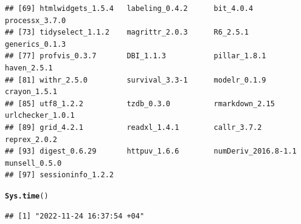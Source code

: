\documentclass{article}\usepackage[]{graphicx}\usepackage[]{xcolor}
\makeatletter
\newcommand{\hlstd}[1]{\textcolor[rgb]{0.345,0.345,0.345}{#1}}%
\newcommand{\hlkwd}[1]{\textcolor[rgb]{0.737,0.353,0.396}{\textbf{#1}}}%
\newenvironment{kframe}{%
 \def\at@end@of@kframe{}%
 \ifinner\ifhmode%
  \def\at@end@of@kframe{\end{minipage}}%
  \begin{minipage}{\columnwidth}%
 \fi\fi%
 \def\FrameCommand##1{\hskip\@totalleftmargin \hskip-\fboxsep
 \colorbox{shadecolor}{##1}\hskip-\fboxsep
     \hskip-\linewidth \hskip-\@totalleftmargin \hskip\columnwidth}%
 \MakeFramed {\advance\hsize-\width
   \@totalleftmargin\z@ \linewidth\hsize
   \@setminipage}}%
 {\par\unskip\endMakeFramed%
 \at@end@of@kframe}
\newenvironment{knitrout}{}{} %
\makeatother
\begin{document}
\begin{knitrout}
\begin{kframe}
\begin{verbatim}
## [69] htmlwidgets_1.5.4   labeling_0.4.2      bit_4.0.4           processx_3.7.0     
## [73] tidyselect_1.1.2    magrittr_2.0.3      R6_2.5.1            generics_0.1.3     
## [77] profvis_0.3.7       DBI_1.1.3           pillar_1.8.1        haven_2.5.1        
## [81] withr_2.5.0         survival_3.3-1      modelr_0.1.9        crayon_1.5.1       
## [85] utf8_1.2.2          tzdb_0.3.0          rmarkdown_2.15      urlchecker_1.0.1   
## [89] grid_4.2.1          readxl_1.4.1        callr_3.7.2         reprex_2.0.2       
## [93] digest_0.6.29       httpuv_1.6.6        numDeriv_2016.8-1.1 munsell_0.5.0      
## [97] sessioninfo_1.2.2
\end{verbatim}
\begin{alltt}
\hlkwd{Sys.time}\hlstd{()}
\end{alltt}
\begin{verbatim}
## [1] "2022-11-24 16:37:54 +04"
\end{verbatim}
\end{kframe}
\end{knitrout}
\end{document}
